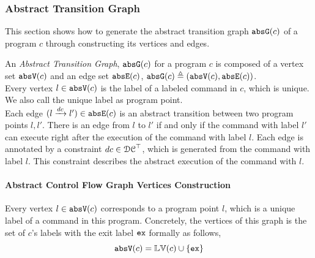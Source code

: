 \subsubsection{Abstract Transition Graph}
\label{sec:abscfg}
This section shows how to generate the abstract transition graph $\mathtt{abs}{\mathtt{G}}(c)$ of a
program $c$ through constructing its vertices and edges.

An \emph{Abstract Transition Graph}, $\mathtt{abs}{\mathtt{G}}(c)$ for a program $c$ is composed of
a vertex set $\mathtt{abs}{\mathtt{V}}(c)$ and an edge set $\mathtt{abs}{\mathtt{E}}(c)$, $\mathtt{abs}{\mathtt{G}}(c) \triangleq (\mathtt{abs}{\mathtt{V}}(c), \mathtt{abs}{\mathtt{E}}(c))$.
%
\\
Every 
vertex $l \in \mathtt{abs}{\mathtt{V}}(c)$ is the label of a labeled command in $c$, which is unique.
We also call the unique label as program point.
\\
Each edge $(l \xrightarrow{dc} l') \in \mathtt{abs}{\mathtt{E}}(c)$ is an abstract transition
between two program points $l, l'$. 
There is an edge from $l$ to $l'$ if and only if
the command with label $l'$ can execute right after the execution of the command with label $l$.
Each edge is annotated by a constraint $dc \in \mathcal{DC}^{\top}$, which is generated from the command with label $l$.
This constraint describes the abstract execution of the command with $l$. 

\paragraph{Abstract Control Flow Graph Vertices Construction}
\label{sec:abscfg-vertex}
Every 
vertex $l \in \mathtt{abs}{\mathtt{V}}(c)$ corresponds to a program point $l$, which is a unique
label of a command in this program.
Concretely,
the vertices of this graph is the set of $c$'s labels with the exit label ${\mathtt{ex}}$ formally as follows,
\[ 
  \mathtt{abs}{\mathtt{V}}(c) = \mathbb{LV}(c)\cup\{{\mathtt{ex}}\}
\]

